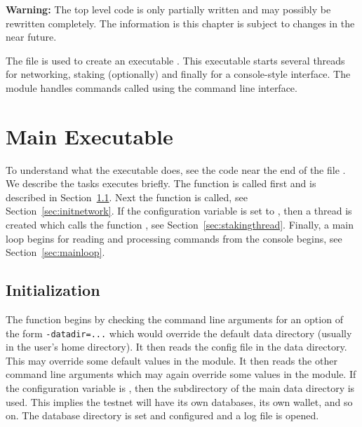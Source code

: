 {\bf{Warning:}} The top level code is only partially written and may possibly be rewritten completely.
The information is this chapter is subject to changes in the near future.

The file {} is
used to create an executable
{}.
This executable starts several threads for networking, staking (optionally)
and finally for a console-style interface.
The module {} handles commands called using the command line
interface.

\section{Main Executable}

To understand what the executable {} does,
see the code near the end of the file {}.
We describe the tasks {} executes briefly.
The function {}
is called first and is described in Section~\ref{sec:init}.
Next the function {} is called,
see Section~\ref{sec:initnetwork}.
If the configuration variable {} is set to {},
then a thread is created which calls the function {},
see Section~\ref{sec:stakingthread}.
Finally, a main loop begins for reading and processing commands
from the console begins,
see Section~\ref{sec:mainloop}.


\subsection{Initialization}\label{sec:init}

The {} function begins by checking the command line arguments for an option
of the form \verb+-datadir=...+
which would override the default data directory (usually {}
in the user's home directory).
It then reads the config file {} in the data directory.
This may override some default values in the {} module.
It then reads the other command line arguments which may again override
some values in the {} module.
If the {} configuration variable is {},
then the {} subdirectory of the main data directory is used.
This implies the testnet will have its own databases, its own wallet, and so on.
The database directory is set and configured and a log file is opened.

